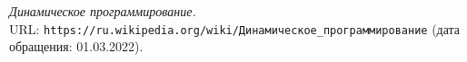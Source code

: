 \pagebreak
\begin{thebibliography}{99}
{\itshape Динамическое программирование.} \\URL: \texttt{https://ru.wikipedia.org/wiki/Динамическое\_программирование} (дата обращения: 01.03.2022).
\end{thebibliography}
\pagebreak